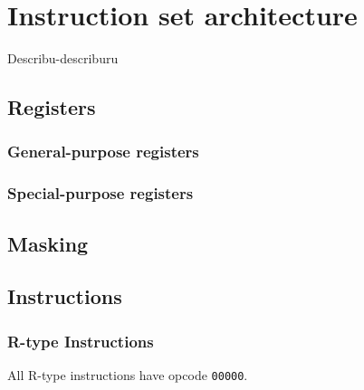 \documentclass[../main/report.tex]{subfiles}
\begin{document}
\chapter{Instruction set architecture}

Describu-describuru

\section{Registers}

\subsection{General-purpose registers}

\subsection{Special-purpose registers}

\section{Masking}

\section{Instructions}

\subsection{R-type Instructions}

All R-type instructions have opcode \verb/00000/.
\end{document}
